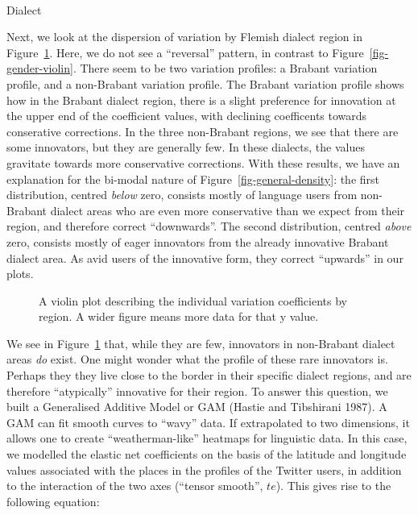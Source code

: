 \documentclass[
  letterpaper,
  DIV=11,
  numbers=noendperiod,
  oneside]{scrartcl}
\makeatletter
\let\oldparagraph\paragraph
\renewcommand{\paragraph}{
    \@ifstar
      \xxxParagraphStar
      \xxxParagraphNoStar
  }
\newcommand{\xxxParagraphStar}[1]{\oldparagraph*{#1}\mbox{}}
\newcommand{\xxxParagraphNoStar}[1]{\oldparagraph{#1}\mbox{}}
\makeatother
\begin{document}
\paragraph{Dialect}\label{dialect}

Next, we look at the dispersion of variation by Flemish dialect region
in Figure~\ref{fig-region-violin}. Here, we do not see a ``reversal''
pattern, in contrast to Figure~\ref{fig-gender-violin}. There seem to be
two variation profiles: a Brabant variation profile, and a non-Brabant
variation profile. The Brabant variation profile shows how in the
Brabant dialect region, there is a slight preference for innovation at
the upper end of the coefficient values, with declining coefficents
towards conserative corrections. In the three non-Brabant regions, we
see that there are some innovators, but they are generally few. In these
dialects, the values gravitate towards more conservative corrections.
With these results, we have an explanation for the bi-modal nature of
Figure~\ref{fig-general-density}: the first distribution, centred
\emph{below} zero, consists mostly of language users from non-Brabant
dialect areas who are even more conservative than we expect from their
region, and therefore correct ``downwards''. The second distribution,
centred \emph{above} zero, consists mostly of eager innovators from the
already innovative Brabant dialect area. As avid users of the innovative
form, they correct ``upwards'' in our plots.

\begin{figure}


\caption{\label{fig-region-violin}A violin plot describing the
individual variation coefficients by region. A wider figure means more
data for that y value.}

\end{figure}%

We see in Figure~\ref{fig-region-violin} that, while they are few,
innovators in non-Brabant dialect areas \emph{do} exist. One might
wonder what the profile of these rare innovators is. Perhaps they they
live close to the border in their specific dialect regions, and are
therefore ``atypically'' innovative for their region. To answer this
question, we built a Generalised Additive Model or GAM (Hastie and
Tibshirani 1987). A GAM can fit smooth curves to ``wavy'' data. If
extrapolated to two dimensions, it allows one to create
``weatherman-like'' heatmaps for linguistic data. In this case, we
modelled the elastic net coefficients on the basis of the latitude and
longitude values associated with the places in the profiles of the
Twitter users, in addition to the interaction of the two axes (``tensor
smooth'', \(te\)). This gives rise to the following equation:
\end{document}

